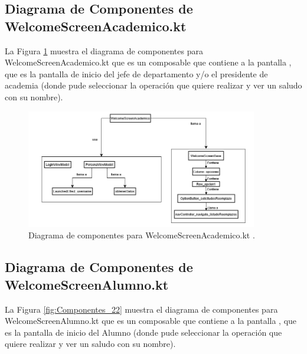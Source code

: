 \newpage

\subsection{Diagrama de Componentes de WelcomeScreenAcademico.kt}

La Figura \ref{fig:Componentes_21} muestra el diagrama de componentes para WelcomeScreenAcademico.kt que es un composable que contiene a la pantalla , que es la pantalla de inicio del jefe de departamento y/o el presidente de academia (donde pude seleccionar la operación que quiere realizar y ver un saludo con su nombre).

\begin{figure}[htbp!]
	\begin{center}
		\includegraphics[width=0.9\textwidth]{DiagramasMoviles/DCM (34)}
		\caption{Diagrama de componentes para WelcomeScreenAcademico.kt .}
		\label{fig:Componentes_21}
	\end{center}
\end{figure}

\newpage

\subsection{Diagrama de Componentes de WelcomeScreenAlumno.kt}

La Figura \ref{fig:Componentes_22} muestra el diagrama de componentes para WelcomeScreenAlumno.kt que es un composable que contiene a la pantalla , que es la pantalla de inicio del Alumno (donde pude seleccionar la operación que quiere realizar y ver un saludo con su nombre).

